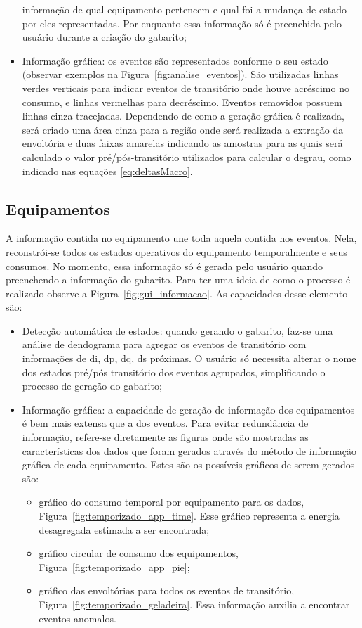 \begin{itemize}
informação de qual equipamento pertencem e qual foi a mudança de estado
por eles representadas. Por enquanto essa informação só é preenchida
pelo usuário durante a criação do gabarito;
\item Informação gráfica: os eventos são representados conforme o seu
estado (observar exemplos na Figura~\ref{fig:analise_eventos}).
São utilizadas linhas verdes verticais para indicar eventos de
transitório onde houve acréscimo no consumo, e linhas vermelhas para
decréscimo.  Eventos removidos possuem linhas cinza tracejadas.
Dependendo de como a geração gráfica é realizada, será criado uma área
cinza para a região onde será realizada a extração da envoltória e
duas faixas amarelas indicando as amostras para as quais será
calculado o valor pré/pós-transitório utilizados para calcular o
degrau, como indicado nas equações
\ref{eq:deltasMacro}.
\end{itemize}


\subsection{Equipamentos}
\label{ssec:equipamento}

A informação contida no equipamento une toda aquela contida nos eventos.
Nela, reconstrói-se todos os estados operativos do equipamento
temporalmente e seus consumos. No momento, essa informação só é gerada
pelo usuário quando preenchendo a informação do gabarito. Para ter uma
ideia de como o processo é realizado observe a
Figura~\ref{fig:gui_informacao}. As capacidades desse elemento são:

\begin{itemize}
\item Detecção automática de estados: quando gerando o gabarito,
faz-se uma análise de dendograma para agregar os eventos de
transitório com informações de \acs{di}, \acs{dp}, \acs{dq}, \acs{ds}
próximas. O usuário só necessita alterar o nome dos estados pré/pós
transitório dos eventos agrupados, simplificando o processo de geração
do gabarito;
\item Informação gráfica: a capacidade de geração de informação dos
equipamentos é bem mais extensa que a dos eventos. Para evitar
redundância de informação, refere-se diretamente as figuras onde são
mostradas as características dos dados que foram gerados através do
método de informação gráfica de cada equipamento. Estes são os possíveis 
gráficos de serem gerados são:
\begin{itemize}
\item gráfico do consumo temporal por equipamento para os dados,
Figura~\ref{fig:temporizado_app_time}. Esse gráfico representa a
energia desagregada estimada a ser encontrada;
\item gráfico circular de consumo dos equipamentos,
Figura~\ref{fig:temporizado_app_pie};
\item gráfico das envoltórias para todos os eventos de transitório,
Figura~\ref{fig:temporizado_geladeira}. Essa informação auxilia a
encontrar eventos anomalos.
\end{itemize}
\end{itemize}

